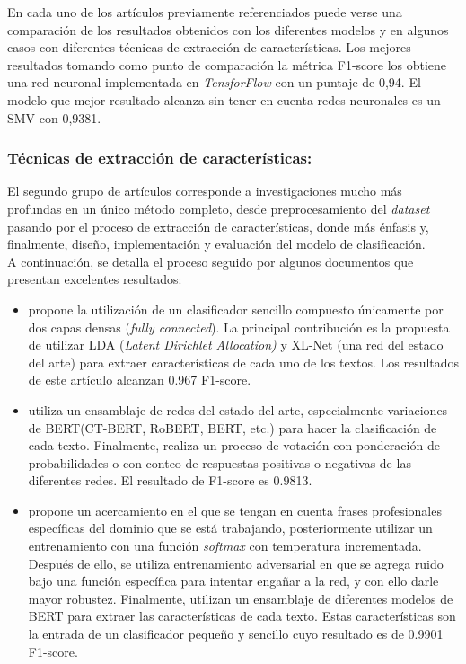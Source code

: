 En cada uno de los artículos previamente referenciados puede verse una comparación de los resultados obtenidos con los diferentes modelos y en algunos casos con diferentes técnicas de extracción de características. Los mejores resultados tomando como punto de comparación la métrica F1-score los obtiene una red neuronal implementada en \textit{TensforFlow} con un puntaje de 0,94. El modelo que mejor resultado alcanza sin tener en cuenta redes neuronales es un SMV con 0,9381. 

\subsubsection{Técnicas de extracción de características:}
El segundo grupo de artículos corresponde a investigaciones mucho más profundas en un único método completo, desde preprocesamiento del \textit{dataset} pasando por el proceso de extracción de características, donde más énfasis y, finalmente, diseño, implementación y evaluación del modelo de clasificación.\\ A continuación, se detalla el proceso seguido por algunos documentos que presentan excelentes resultados:

\begin{itemize}
    \item \cite{XLNetCovid} propone la utilización de un clasificador sencillo compuesto únicamente por dos capas densas (\textit{fully connected}). La principal contribución es la propuesta de utilizar LDA (\textit{Latent Dirichlet Allocation)} y XL-Net (una red del estado del arte) para extraer características de cada uno de los textos. Los resultados de este artículo alcanzan 0.967 F1-score.
        
    \item \cite{Heuristic} utiliza un ensamblaje de redes del estado del arte, especialmente variaciones de BERT(CT-BERT, RoBERT, BERT, etc.) para hacer la clasificación de cada texto. Finalmente, realiza un proceso de votación con ponderación de probabilidades o con conteo de respuestas positivas o negativas de las diferentes redes. El resultado de F1-score es 0.9813.
        
    \item \cite{TranformerBasedFineTuning} propone un acercamiento en el que se tengan en cuenta frases profesionales específicas del dominio que se está trabajando, posteriormente utilizar un entrenamiento con una función \textit{softmax} con temperatura incrementada. Después de ello, se utiliza entrenamiento adversarial en que se agrega ruido bajo una función específica para intentar engañar a la red, y con ello darle mayor robustez. Finalmente, utilizan un ensamblaje de diferentes modelos de BERT para extraer las características de cada texto. Estas características son la entrada de un clasificador pequeño y sencillo cuyo resultado es de 0.9901 F1-score.
\end{itemize}

